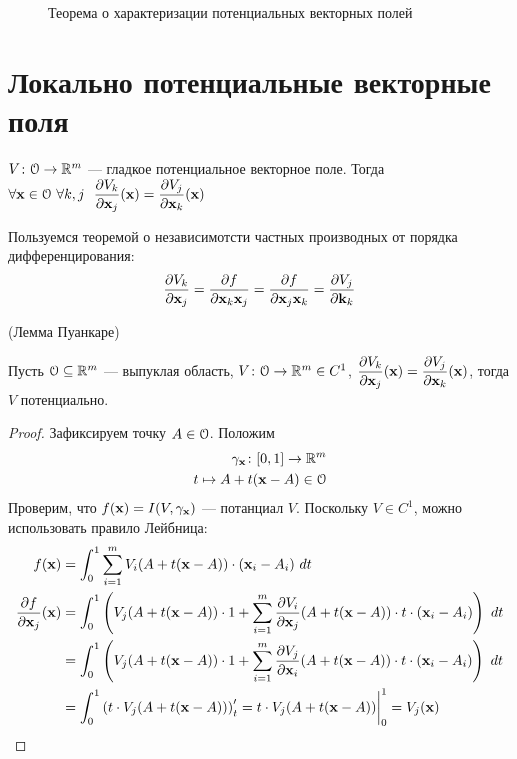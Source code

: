 \newpage

\begin{figure}[ht]
    \centering
    \caption{Теорема о характеризации потенциальных векторных полей}
\end{figure}

\section{Локально потенциальные векторные поля}

\begin{lemma}
    $V \colon \mathcal{O} \to \mathbb{R}^m$ --- гладкое потенциальное векторное поле. Тогда \\
    $\forall \mathbf{x} \in \mathcal{O}~ \forall k, j~~
    \dfrac{\partial V_k}{\partial \mathbf{x}_j}(\mathbf{x}) = \dfrac{\partial V_j}{\partial \mathbf{x}_k}(\mathbf{x})$
\end{lemma}
\begin{definition}
    Пользуемся теоремой о независимотсти частных производных от порядка дифференцирования:
\[
    \dfrac{\partial V_k}{\partial \mathbf{x}_j} = \dfrac{\partial f}{\partial \mathbf{x}_k \mathbf{x}_j} = \dfrac{\partial f}{\partial \mathbf{x}_j \mathbf{x}_k} =
    \dfrac{\partial V_j}{\partial \mathbf{k}_k}
\]
\end{definition}

\begin{theorem}(Лемма Пуанкаре)

    Пусть $\mathcal{O} \subseteq \mathbb{R}^m$ --- выпуклая область, $V \colon \mathcal{O} \to \mathbb{R}^m \in C^1$,
    $\dfrac{\partial V_k}{\partial \mathbf{x}_j}(\mathbf{x}) = \dfrac{\partial V_j}{\partial \mathbf{x}_k}(\mathbf{x})$, тогда $V$ потенциально.
\end{theorem}
\begin{proof}
     Зафиксируем точку $A \in \mathcal{O}$. Положим
\begin{align*}
    \gamma_{\mathbf{x}} \colon [0, 1] \to \mathbb{R}^m \\
    t \mapsto A + t(\mathbf{x} - A) \in \mathcal{O}
\end{align*}
    Проверим, что $f(\mathbf{x}) = I(V, \gamma_{\mathbf{x}})$ --- потанциал $V$. Поскольку
    $V \in C^1$, можно использовать правило Лейбница:
\begin{align*}
    f(\mathbf{x}) &= \int_0^1{\sum_{i = 1}^{m}{V_i(A + t(\mathbf{x} - A)) \cdot (\mathbf{x}_i - A_i) ~dt}} \\
    \dfrac{\partial f}{\partial \mathbf{x}_j}(\mathbf{x}) &= \int_0^1{\left(V_j(A + t(\mathbf{x} - A)) \cdot 1 + \sum_{i = 1}^{m}
    {\dfrac{\partial V_i}{\partial \mathbf{x}_j}{(A + t(\mathbf{x} - A)) \cdot t} \cdot (\mathbf{x}_i - A_i)}\right)~dt} \\
    &= \int_0^1{\left(V_j(A + t(\mathbf{x} - A)) \cdot 1 + \sum_{i = 1}^{m}
    {\dfrac{\partial V_j}{\partial \mathbf{x}_i}{(A + t(\mathbf{x} - A)) \cdot t} \cdot (\mathbf{x}_i - A_i)}\right)~dt} \\
    &= \int_0^1{\left( t \cdot V_j(A + t(\mathbf{x} - A)) \right)'_t}
    = t \cdot V_j(A + t(\mathbf{x} - A))\bigg|_0^1 = V_j(\mathbf{x})
\end{align*}
\end{proof}

